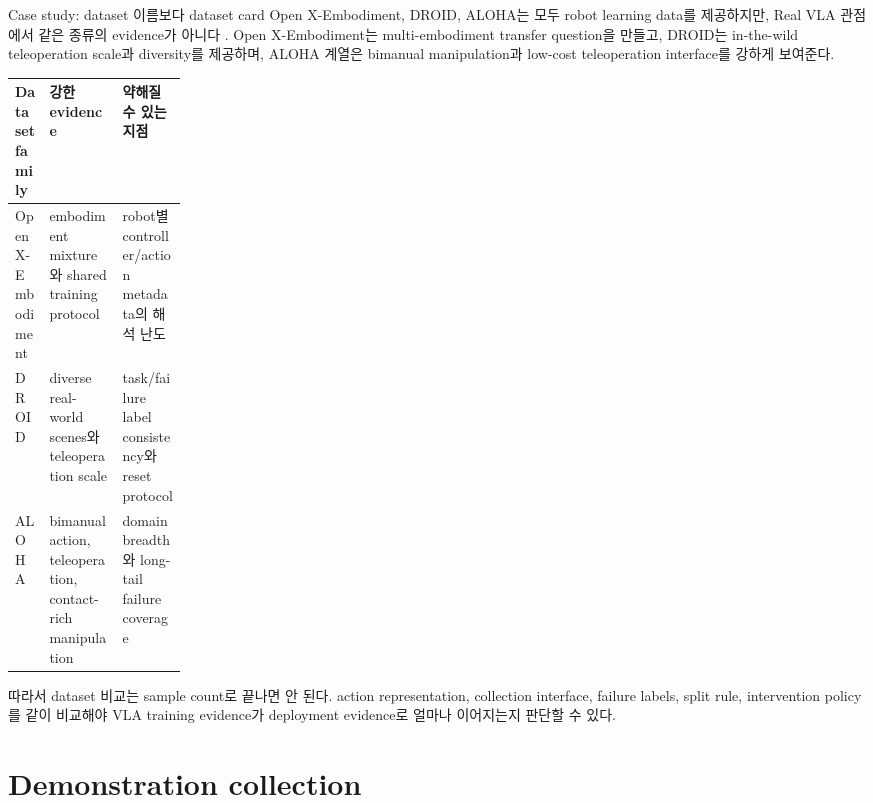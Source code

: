 \begin{casebox}{Case study: dataset 이름보다 dataset card}
Open X-Embodiment, DROID, ALOHA는 모두 robot learning data를 제공하지만, Real VLA 관점에서 같은 종류의 evidence가 아니다 \cite{openx2023,droid2024,act2023}. Open X-Embodiment는 multi-embodiment transfer question을 만들고, DROID는 in-the-wild teleoperation scale과 diversity를 제공하며, ALOHA 계열은 bimanual manipulation과 low-cost teleoperation interface를 강하게 보여준다.

\begin{center}
\small
\begin{tabularx}{\linewidth}{@{}p{0.2\linewidth}X X@{}}
\toprule
Dataset family & 강한 evidence & 약해질 수 있는 지점 \\
\midrule
Open X-Embodiment & embodiment mixture와 shared training protocol & robot별 controller/action metadata의 해석 난도 \\
DROID & diverse real-world scenes와 teleoperation scale & task/failure label consistency와 reset protocol \\
ALOHA & bimanual action, teleoperation, contact-rich manipulation & domain breadth와 long-tail failure coverage \\
\bottomrule
\end{tabularx}
\end{center}

따라서 dataset 비교는 sample count로 끝나면 안 된다. action representation, collection interface, failure labels, split rule, intervention policy를 같이 비교해야 VLA training evidence가 deployment evidence로 얼마나 이어지는지 판단할 수 있다.
\end{casebox}

\section{Demonstration collection}


